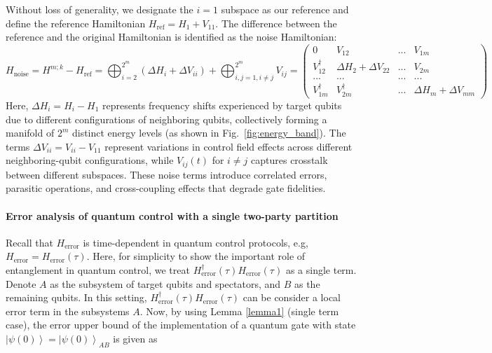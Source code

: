\documentclass[12pt]{article}
\newcommand{\ket}[1]{\left|#1\right\rangle}
\begin{document}
Without loss of generality, we designate the $i=1$ subspace as our reference and define the reference Hamiltonian $H_{\text{ref}}=H_1+V_{11}$. The difference between the reference and the original Hamiltonian is identified as the noise Hamiltonian:
\begin{equation}
H_{\text{noise}} = H^{m;k}-H_{\text{ref}}=\bigoplus_{i=2}^{2^m} (\Delta H_i + \Delta V_{ii}) + \bigoplus_{i,j=1,i\neq j}^{2^m} V_{ij}=\begin{pmatrix}
            0 & V_{12} & ... & V_{1m} \\
            V^\dagger_{12} & \Delta H_2 + \Delta V_{22}& ... & V_{2m} \\
            ... & ... & ... & ...\\
            V^\dagger_{1m} & V^\dagger_{2m}  & ... & \Delta H_m +\Delta V_{mm}
           \end{pmatrix}   
\end{equation}
Here, $\Delta H_i=H_i-H_1$ represents frequency shifts experienced by target qubits due to different configurations of neighboring qubits, collectively forming a manifold of $2^m$ distinct energy levels (as shown in Fig.~\ref{fig:energy_band}). The terms $\Delta V_{ii}=V_{ii}-V_{11}$ represent variations in control field effects across different neighboring-qubit configurations, while $V_{ij}(t)$ for $i\neq j$ captures crosstalk between different subspaces. These noise terms introduce correlated errors, parasitic operations, and cross-coupling effects that degrade gate fidelities.


\paragraph*{Error analysis of quantum control with a single two-party partition}





Recall that $H_{\text{error}}$ is time-dependent in quantum control protocols, e.g, $H_{\text{error}}=H_{\text{error}}(\tau)$. 
Here, for simplicity to show the important role of entanglement in quantum control, we treat $H_{\text{error}}^\dagger (
       \tau ) H_{\text{error}}(\tau)$ as a single term. Denote $A$ as the subsystem of target qubits and spectators, and $B$ as the remaining qubits. In this setting, $H_{\text{error}}^\dagger (
       \tau ) H_{\text{error}}(\tau)$ can be consider a local error term in the subsystems $A$. 
Now, by using Lemma \ref{lemma1} (single term case), the error upper bound of the implementation of a quantum gate with state $\ket{\psi(0)}=\ket{\psi(0)}_{AB}$ is given as 
\end{document}
